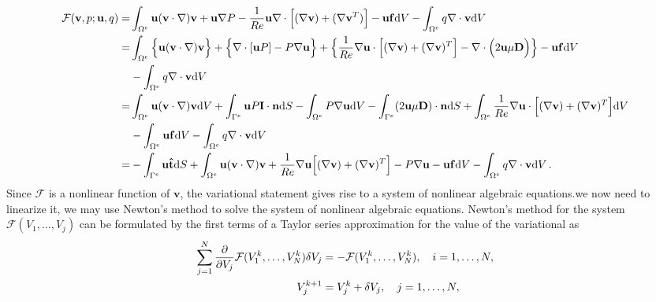 \documentclass[]{article}
\begin{document}
\begin{equation}\label{eq9}
	\begin{aligned}
		\mathcal{F}(\mathbf{v},p;\mathbf{u},q) =&\int_{\Omega^e} \mathbf{u}(\mathbf{v} \cdot \nabla) \mathbf{v}+\mathbf{u}\nabla P - \frac{1}{Re}\mathbf{u} \nabla \cdot \Big[(\nabla \mathbf{v}) + (\nabla \mathbf{v}^T)  \Big]
		- \mathbf{u} \mathbf{f} \mathrm{d}V -\int_{\Omega^e} q \nabla \cdot\mathbf{v} \mathrm{d}V\\
		=&\int_{\Omega^e} \Big\{\mathbf{u}(\mathbf{v} \cdot \nabla) \mathbf{v}\Big\} + \Big\{\nabla \cdot [\mathbf{u}P] - P\nabla  \mathbf{u} \Big\} + \Big\{\frac{1}{Re}\nabla \mathbf{u} \cdot\Big[(\nabla \mathbf{v}) + (\nabla \mathbf{v})^T  \Big] - \nabla \cdot \Big(2\mathbf{u}\mu \mathbf{D} \Big) \Big\} - \mathbf{u} \mathbf{f}\mathrm{d}V\\
		 &-\int_{\Omega^e} q \nabla \cdot\mathbf{v} \mathrm{d}V \\
		=&\int_{\Omega^e} \mathbf{u}(\mathbf{v} \cdot \nabla) \mathbf{v}\mathrm{d}V + \int_{\Gamma^e} \mathbf{u}P \mathbf{I} \cdot \mathbf{n} \mathrm{d}S
		-\int_{\Omega^e}P\nabla  \mathbf{u} \mathrm{d}V
		-\int_{\Gamma^e} (2\mathbf{u}\mu \mathbf{D}) \cdot \mathbf{n} \mathrm{d}S
		+\int_{\Omega^e}\frac{1}{Re} \nabla\mathbf{u}\cdot\Big[(\nabla \mathbf{v}) + (\nabla \mathbf{v})^T  \Big] \mathrm{d}V\\
		&-\int_{\Omega^e}\mathbf{u} \mathbf{f} \mathrm{d}V - \int_{\Omega^e} q \nabla \cdot \mathbf{v} \mathrm{d}V \\ 
		=&-\int_{\Gamma^e} \mathbf{u} \mathbf{\hat{t}}\mathrm{d}S
		+\int_{\Omega^e} \mathbf{u}(\mathbf{v} \cdot \nabla) \mathbf{v} + \frac{1}{Re} \nabla \mathbf{u} \Big[(\nabla \mathbf{v}) + (\nabla \mathbf{v})^T  \Big] - P\nabla \mathbf{u} - \mathbf{u} \mathbf{f}\mathrm{d}V - \int_{\Omega^e} q \nabla \cdot \mathbf{v} \mathrm{d}V \thinspace.
	\end{aligned}
\end{equation}
Since $	\mathcal{F}$ is a nonlinear function of $\mathbf{v}$, the variational statement gives rise to a system of nonlinear algebraic equations.we now need to linearize it, we may use Newton’s method to solve the system of nonlinear algebraic equations. Newton’s method for the system $\mathcal{F}(V_1,\ldots,V_j)$ can be formulated by the first terms of a Taylor series approximation for the value of the variational as
\begin{equation}\label{eq10}
	\begin{aligned}
		\sum_{j=1}^N {\partial \over\partial V_j} \mathcal{F}(V_1^k,\ldots,V_N^k)\delta V_j &= -\mathcal{F}(V_1^k,\ldots,V_N^k),\quad i=1, \ldots ,N,\\ V_j^{k+1} &= V_j^k + \delta V_j,\quad j=1, \ldots ,N,
	\end{aligned}
\end{equation}
\end{document}
